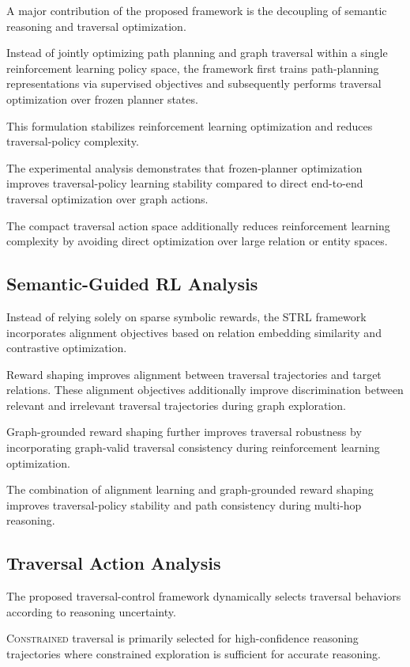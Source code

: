 \documentclass[10pt,conference]{IEEEtran}
\begin{document}
A major contribution of the proposed framework is the decoupling of semantic reasoning and traversal optimization.

Instead of jointly optimizing path planning and graph traversal within a single reinforcement learning policy space, the framework first trains path-planning representations via supervised objectives and subsequently performs traversal optimization over frozen planner states.

This formulation stabilizes reinforcement learning optimization and reduces traversal-policy complexity.

The experimental analysis demonstrates that frozen-planner optimization improves traversal-policy learning stability compared to direct end-to-end traversal optimization over graph actions.

The compact traversal action space additionally reduces reinforcement learning complexity by avoiding direct optimization over large relation or entity spaces.

\subsection{Semantic-Guided RL Analysis}

Instead of relying solely on sparse symbolic rewards, the STRL framework incorporates alignment objectives based on relation embedding similarity and contrastive optimization.

Reward shaping improves alignment between traversal trajectories and target relations. These alignment objectives additionally improve discrimination between relevant and irrelevant traversal trajectories during graph exploration.

Graph-grounded reward shaping further improves traversal robustness by incorporating graph-valid traversal consistency during reinforcement learning optimization.

The combination of alignment learning and graph-grounded reward shaping improves traversal-policy stability and path consistency during multi-hop reasoning.

\subsection{Traversal Action Analysis}

The proposed traversal-control framework dynamically selects traversal behaviors according to reasoning uncertainty.

\textsc{Constrained} traversal is primarily selected for high-confidence reasoning trajectories where constrained exploration is sufficient for accurate reasoning.
\end{document}
